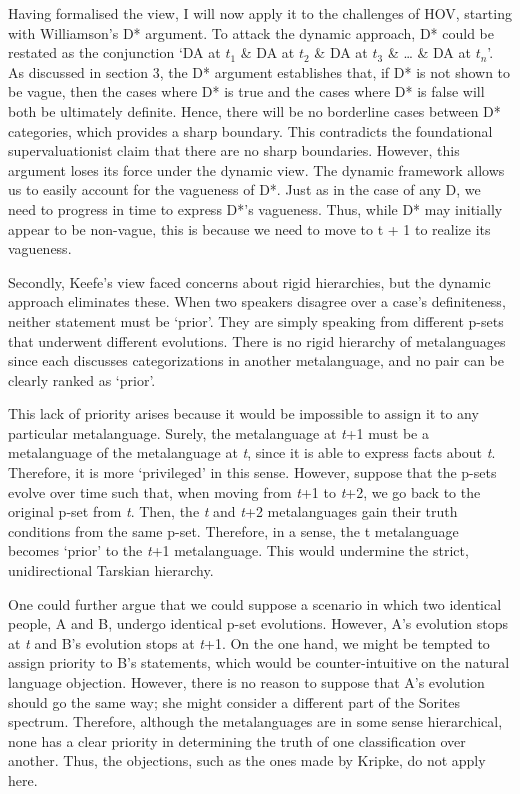 Having formalised the view, I will now apply it to the challenges of
HOV, starting with Williamson's D* argument. To attack the dynamic
approach, D* could be restated as the conjunction `DA at \(t_{1}\) \& DA
at \(t_{2}\) \& DA at \(t_{3}\) \& \ldots{} \& DA at \(t_{n}\)'. As
discussed in section 3, the D* argument establishes that, if D* is not
shown to be vague, then the cases where D* is true and the cases where
D* is false will both be ultimately definite. Hence, there will be no
borderline cases between D* categories, which provides a sharp boundary.
This contradicts the foundational supervaluationist claim that there are
no sharp boundaries. However, this argument loses its force under the
dynamic view. The dynamic framework allows us to easily account for the
vagueness of D*. Just as in the case of any D, we need to progress in
time to express D*'s vagueness. Thus, while D* may initially appear to
be non-vague, this is because we need to move to t + 1 to realize its
vagueness.

Secondly, Keefe's view faced concerns about rigid hierarchies, but the
dynamic approach eliminates these. When two speakers disagree over a
case's definiteness, neither statement must be `prior'. They are simply
speaking from different p-sets that underwent different evolutions.
There is no rigid hierarchy of metalanguages since each discusses
categorizations in another metalanguage, and no pair can be clearly
ranked as `prior'.

This lack of priority arises because it would be impossible to assign it
to any particular metalanguage. Surely, the metalanguage at \emph{t}+1
must be a metalanguage of the metalanguage at \emph{t}, since it is able
to express facts about \emph{t}. Therefore, it is more `privileged' in
this sense. However, suppose that the p-sets evolve over time such that,
when moving from \emph{t}+1 to \emph{t}+2, we go back to the original
p-set from \emph{t}. Then, the \emph{t} and \emph{t}+2 metalanguages
gain their truth conditions from the same p-set. Therefore, in a sense,
the t metalanguage becomes `prior' to the \emph{t}+1 metalanguage. This
would undermine the strict, unidirectional Tarskian hierarchy.

One could further argue that we could suppose a scenario in which two
identical people, A and B, undergo identical p-set evolutions. However,
A's evolution stops at \emph{t} and B's evolution stops at \emph{t}+1.
On the one hand, we might be tempted to assign priority to B's
statements, which would be counter-intuitive on the natural language
objection. However, there is no reason to suppose that A's evolution
should go the same way; she might consider a different part of the
Sorites spectrum. Therefore, although the metalanguages are in some
sense hierarchical, none has a clear priority in determining the truth
of one classification over another. Thus, the objections, such as the
ones made by Kripke, do not apply here.

